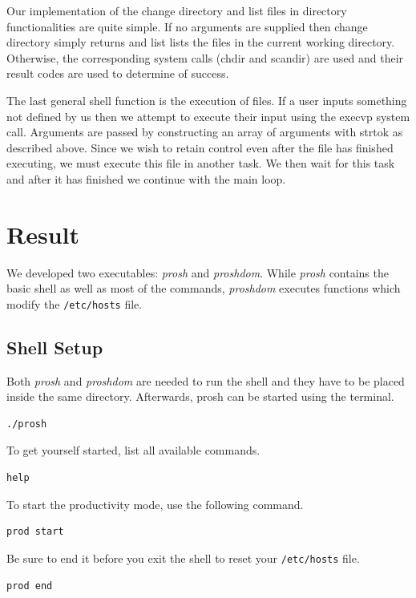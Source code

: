\documentclass{article}
\begin{document}
Our implementation of the change directory and list files in directory functionalities are quite simple. If no arguments are supplied then change directory simply returns and list lists the files in the current working directory. Otherwise, the corresponding system calls (chdir and scandir) are used and their result codes are used to determine of success.

The last general shell function is the execution of files. If a user inputs something not defined by us then we attempt to execute their input using the execvp system call. Arguments are passed by constructing an array of arguments with strtok as described above. Since we wish to retain control even after the file has finished executing, we must execute this file in another task. We then wait for this task and after it has finished we continue with the main loop.

\section{Result}

We developed two executables: \textit{prosh} and \textit{proshdom}. While \textit{prosh} contains the basic shell as well as most of the commands, \textit{proshdom} executes functions which modify the \texttt{/etc/hosts} file. 

\subsection{Shell Setup}

Both \textit{prosh} and \textit{proshdom} are needed to run the shell and they have to be placed inside the same directory. Afterwards, prosh can be started using the terminal.
\begin{lstlisting}[numbers=none]
./prosh
\end{lstlisting}

To get yourself started, list all available commands.
\begin{lstlisting}[numbers=none]
help
\end{lstlisting}

To start the productivity mode, use the following command.
\begin{lstlisting}[numbers=none]
prod start
\end{lstlisting}

Be sure to end it before you exit the shell to reset your \texttt{/etc/hosts} file.
\begin{lstlisting}[numbers=none]
prod end
\end{lstlisting}
\end{document}
